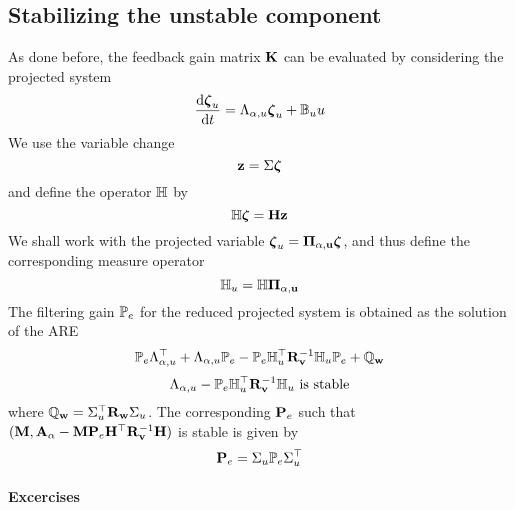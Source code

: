 \documentclass[12pt]{article}
\begin{document}
\subsection{Stabilizing the unstable component}
As done before, the feedback gain matrix ${\mathbf K}$ can be evaluated by considering the projected system
\[
 \frac{\textrm{d} \boldsymbol{\zeta}_u}{\textrm{d} t} = \Lambda_{\alpha,u} \boldsymbol{\zeta}_u + \mathbb{B}_u u
\]
We use the variable change
\[
 {\mathbf z} = \Sigma \boldsymbol{\zeta}
\]
and define the operator $\mathbb{H}$ by
\[
 \mathbb{H} \boldsymbol{\zeta} = {\mathbf H} {\mathbf z}
\]
We shall work with the projected variable $\boldsymbol{\zeta}_u = \mathbf{\Pi_{\alpha,u}} \boldsymbol{\zeta}$, and thus define the corresponding measure operator
\[
 \mathbb{H}_u = \mathbb{H} \mathbf{\Pi_{\alpha,u}}
\]
The filtering gain $\mathbb{P}_e$ for the reduced projected system is obtained as the solution of the ARE
\[
 \mathbb{P}_e \Lambda_{\alpha,u}^\top + \Lambda_{\alpha,u} \mathbb{P}_e - \mathbb{P}_e \mathbb{H}_u^\top {\mathbf R}_{\mathbf v}^{-1} \mathbb{H}_u \mathbb{P}_e + \mathbb{Q}_{\mathbf w}
\]
\[
 \Lambda_{\alpha,u} - \mathbb{P}_e \mathbb{H}_u^\top {\mathbf R}_{\mathbf v}^{-1} \mathbb{H}_u \text{ is stable} 
\]
where $\mathbb{Q}_{\mathbf w} = \Sigma_u^\top {\mathbf R}_{\mathbf w} \Sigma_u$. The corresponding ${\mathbf P}_e$ such that $({\mathbf M},{\mathbf A}_\alpha - {\mathbf M} {\mathbf P}_e {\mathbf H}^\top {\mathbf R}_{\mathbf v}^{-1} {\mathbf H})$ is stable is given by
\[
 {\mathbf P}_e = \Sigma_u \mathbb{P}_e \Sigma^\top_u
\]

\paragraph{Excercises}
\end{document}
